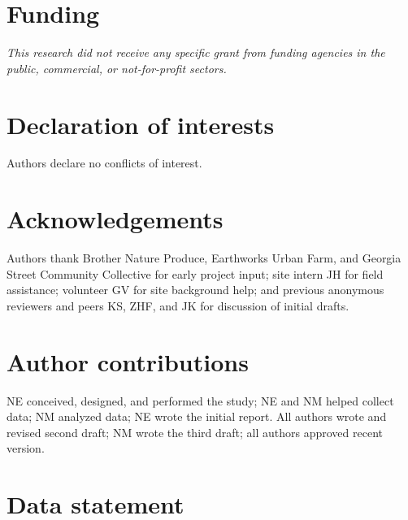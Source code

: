 \documentclass[
  12pt,
]{article}
\begin{document}
\newpage

\hypertarget{funding}{%
\section*{Funding}\label{funding}}

\emph{This research did not receive any specific grant from funding agencies in the public, commercial, or not-for-profit sectors.}

\hypertarget{declaration-of-interests}{%
\section*{Declaration of interests}\label{declaration-of-interests}}

Authors declare no conflicts of interest.

\hypertarget{acknowledgements}{%
\section*{Acknowledgements}\label{acknowledgements}}

Authors thank Brother Nature Produce, Earthworks Urban Farm, and Georgia Street Community Collective for early project input; site intern JH for field assistance; volunteer GV for site background help; and previous anonymous reviewers and peers KS, ZHF, and JK for discussion of initial drafts.

\hypertarget{author-contributions}{%
\section*{Author contributions}\label{author-contributions}}

NE conceived, designed, and performed the study; NE and NM helped collect data; NM analyzed data; NE wrote the initial report. All authors wrote and revised second draft; NM wrote the third draft; all authors approved recent version.

\hypertarget{data-statement}{%
\section*{Data statement}\label{data-statement}}
\end{document}
